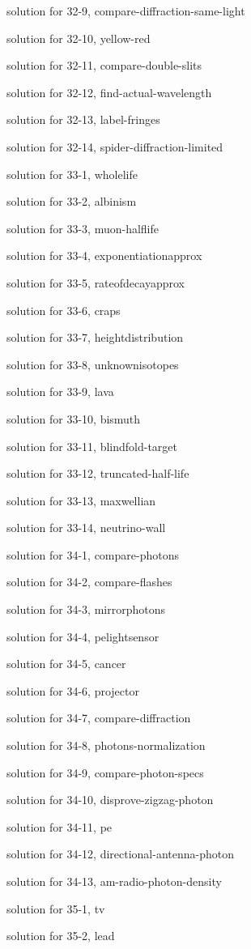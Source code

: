 \documentclass{problems}
\begin{document}
solution for 32-9, compare-diffraction-same-light

solution for 32-10, yellow-red

solution for 32-11, compare-double-slits

solution for 32-12, find-actual-wavelength

solution for 32-13, label-fringes

solution for 32-14, spider-diffraction-limited

solution for 33-1, wholelife

solution for 33-2, albinism

solution for 33-3, muon-halflife

solution for 33-4, exponentiationapprox

solution for 33-5, rateofdecayapprox

solution for 33-6, craps

solution for 33-7, heightdistribution

solution for 33-8, unknownisotopes

solution for 33-9, lava

solution for 33-10, bismuth

solution for 33-11, blindfold-target

solution for 33-12, truncated-half-life

solution for 33-13, maxwellian

solution for 33-14, neutrino-wall

solution for 34-1, compare-photons

solution for 34-2, compare-flashes

solution for 34-3, mirrorphotons

solution for 34-4, pelightsensor

solution for 34-5, cancer

solution for 34-6, projector

solution for 34-7, compare-diffraction

solution for 34-8, photons-normalization

solution for 34-9, compare-photon-specs

solution for 34-10, disprove-zigzag-photon

solution for 34-11, pe

solution for 34-12, directional-antenna-photon

solution for 34-13, am-radio-photon-density

solution for 35-1, tv

solution for 35-2, lead
\end{document}

